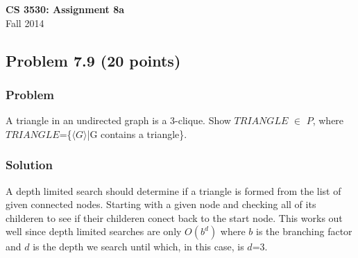 \documentclass{article}
\begin{document}
\begin{center}
\textbf{\Large CS 3530: Assignment 8a} \\[2mm]
Fall 2014
\end{center}

\raggedright

\subsection*{Problem 7.9 (20 points)}

\subsubsection*{Problem}

A triangle in an undirected graph is a 3-clique. Show $TRIANGLE$ $\in$ $P$,
where $TRIANGLE$=\{$\langle G\rangle$|G contains a triangle\}.

\subsubsection*{Solution}

A depth limited search should determine if a triangle is formed
from the list of given connected nodes. Starting with a given node and checking all of
its childeren to see if their childeren conect back to the start node. This works out 
well since depth limited searches are only $O(b^d)$ where $b$ is the branching factor
and $d$ is the depth we search until which, in this case, is $d$=3.
\end{document}
